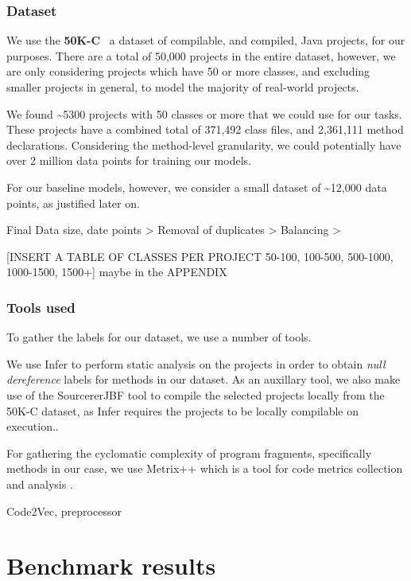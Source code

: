 \documentclass[sigplan,review,anonymous]{acmart}\settopmatter{printfolios=true,printccs=false,printacmref=false}
\begin{document}
\subsubsection{Dataset}
We use the \textbf{50K-C}~\citep{10.1145/3196398.3196450KC} a dataset of compilable, and compiled, Java projects, for our purposes. There are a total of 50,000 projects in the entire dataset, however, we are only considering projects which have 50 or more classes, and excluding smaller projects in general, to model the majority of real-world projects.

We found \textasciitilde5300 projects with 50 classes or more that we could use for our tasks. These projects have a combined total of 371,492 class files, and 2,361,111 method declarations. Considering the method-level granularity, we could potentially have over 2 million data points for training our models. 

For our baseline models, however, we consider a small dataset of \textasciitilde12,000 data points, as justified later on. 

Final Data size, date points > Removal of duplicates > Balancing >

[INSERT A TABLE OF CLASSES PER PROJECT 50-100, 100-500, 500-1000, 1000-1500, 1500+] maybe in the APPENDIX

\subsubsection{Tools used}

To gather the labels for our dataset, we use a number of tools.

We use Infer \cite{fbinfer} to perform static analysis on the projects in order to obtain \textit{null dereference} labels for methods in our dataset. As an auxillary tool, we also make use of the SourcererJBF tool to compile the selected projects locally from the 50K-C dataset, as Infer requires the projects to be locally compilable on execution.. 

For gathering the cyclomatic complexity \cite{1702388cycl} of program fragments, specifically methods in our case, we use Metrix++ \cite{metrixplusplus} which is a tool for code metrics collection and analysis .


Code2Vec, preprocessor

\section{Benchmark results}
\end{document}

